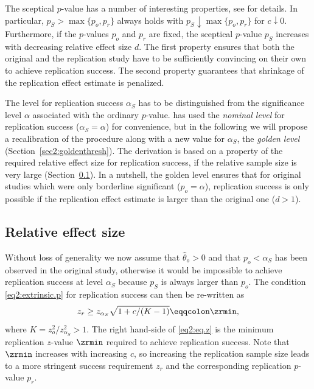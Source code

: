 The sceptical $p$-value has a number of interesting properties, see
\citet[Section 3.1]{Held2020} for details. In particular,
$p_S > \max\{p_o, p_r\}$ always holds with $p_S \downarrow \max\{p_o, p_r\}$ for
$c \downarrow 0$. Furthermore, if the $p$-values $p_o$ and $p_r$ are fixed, the
sceptical $p$-value $p_S$ increases with decreasing relative effect size $d$.
The first property ensures that both the original and the replication study have
to be sufficiently convincing on their own to achieve replication success. The
second property guarantees that shrinkage of the replication effect estimate is
penalized.

The level for replication success $\alpha_S$ has to be distinguished from the
significance level $\alpha$ associated with the ordinary $p$-value.
\citet{Held2020} has used the \textit{nominal level} for replication success
($\alpha_S=\alpha$) for convenience, but in the following we will propose a
recalibration of the procedure along with a new value for $\alpha_S$, the
\textit{golden level} (Section~\ref{sec2:goldenthresh}). The derivation is based
on a property of the required relative effect size for replication success, if
the relative sample size is very large (Section~\ref{sec2:res}). In a nutshell,
the golden level ensures that for original studies which were only borderline
significant ($p_o=\alpha$), replication success is only possible if the
replication
effect estimate is larger than the original one ($d > 1$).\\


\subsection{Relative effect size}\label{sec2:res}
Without loss of generality we now assume that $\hat \theta_o > 0$ and that
$p_o < {\alpha_S}$ has been observed in the original study, otherwise it would
be impossible to achieve replication success at level $\alpha_S$ because $p_S$
is always larger than $p_o$. The condition \eqref{eq2:extrinsic.p} for
replication success can then be re-written as
\begin{equation}\label{eq2:eq.z}
  z_r \geq   z_{{\alpha_S}} \sqrt{1+c/(K-1)} \eqqcolon  \zrmin,
\end{equation}
where $K=z_o^2/z_{{\alpha_S}}^2>1$. The right hand-side of \eqref{eq2:eq.z} is
the minimum replication $z$-value $\zrmin$ required to achieve replication
success. Note that $\zrmin$ increases with increasing $c$, so increasing the
replication sample size leads to a more stringent success requirement $z_r$ and
the corresponding replication $p$-value $p_r$.

